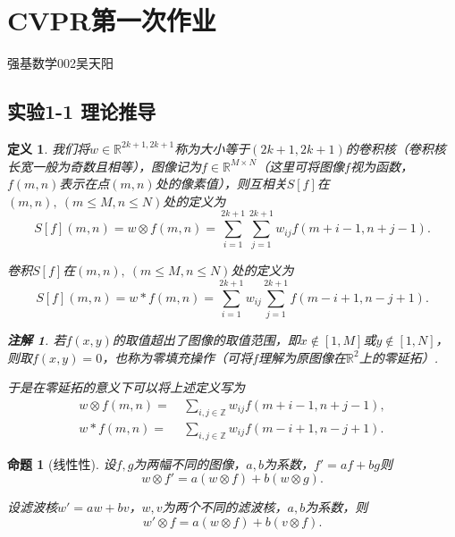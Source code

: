 \documentclass[12pt, a4paper, oneside]{ctexart}
\newtheorem{definition}{定义}
\newtheorem{proposition}{命题}
\newtheorem{remark}{注解}
\let\leq=\leqslant %
\def\R{\mathbb{R}}          %
\def\Z{\mathbb{Z}}          %
\begin{document}
\section*{CVPR第一次作业}\vspace{-0.5cm}
\begin{center}
    强基数学002\quad 吴天阳
\end{center}

\setcounter{section}{1}
\subsection{实验1-1 理论推导}
\begin{definition}
    我们将$w\in\R^{2k+1, 2k+1}$称为大小等于$(2k+1,2k+1)$的卷积核（卷积核长宽一般为奇数且相等），图像记为$f\in\R^{M\times N}$（这里可将图像$f$视为函数，$f(m,n)$表示在点$(m,n)$处的像素值），则互相关$S[f]$在$(m,n),\ (m\leq M, n\leq N)$处的定义为
    \begin{equation*}
        S[f](m, n) = w\otimes f(m, n) = \sum_{i=1}^{2k+1}\sum_{j=1}^{2k+1}w_{ij}f(m+i-1, n+j-1).
    \end{equation*}

    卷积$S[f]$在$(m,n),\ (m\leq M, n\leq N)$处的定义为
    \begin{equation*}
        S[f](m, n) = w* f(m, n) = \sum_{i=1}^{2k+1}w_{ij}\sum_{j=1}^{2k+1}f(m-i+1, n-j+1).
    \end{equation*}
    \begin{remark}
        若$f(x, y)$的取值超出了图像的取值范围，即$x\notin[1, M]$或$y\notin[1,N]$，则取$f(x, y) = 0$，也称为零填充操作（可将$f$理解为原图像在$\R^2$上的零延拓）.

        于是在零延拓的意义下可以将上述定义写为
        \begin{align*}
            w\otimes f(m, n) =&\ \sum_{i,j\in\Z}w_{ij}f(m+i-1,n+j-1),\\
            w*f(m, n) =&\ \sum_{i,j\in\Z}w_{ij}f(m-i+1,n-j+1).
        \end{align*}
    \end{remark}
\end{definition}
\begin{proposition}[线性性]
    设$f, g$为两幅不同的图像，$a, b$为系数，$f' = af+bg$则
    \begin{equation*}
        w\otimes f' = a(w\otimes f) + b(w\otimes g).
    \end{equation*}

    设滤波核$w' = aw+bv$，$w, v$为两个不同的滤波核，$a, b$为系数，则
    \begin{equation*}
        w'\otimes f = a(w\otimes f) + b(v\otimes f).
    \end{equation*}
\end{proposition}
\end{document}
